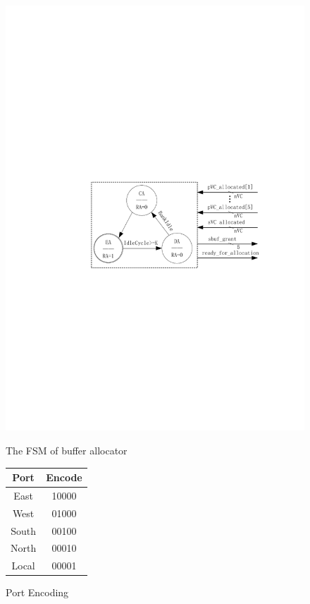 \documentclass[10pt,conference]{IEEEtran}
\begin{document}
\begin{figure}[htb]
  \begin{minipage}[b]{0.31\textwidth}
    \centering\includegraphics[scale=0.65]{figures/allocFSM.pdf}
    \caption{The FSM of buffer allocator}\label{allocFSM}
  \end{minipage}%
  \begin{minipage}[b]{0.2\textwidth}
    \centering
    \begin{tabular}{|c|c|}
      \hline
      Port & Encode \\
      \hline\hline
      East  & 10000 \\
      \hline
      West    & 01000 \\
      \hline
      South &   00100\\
      \hline
      North & 00010\\
      \hline
      Local & 00001\\
      \hline
    \end{tabular}
    \caption{Port Encoding}\label{portencode}
  \end{minipage}
\end{figure}
\end{document}
